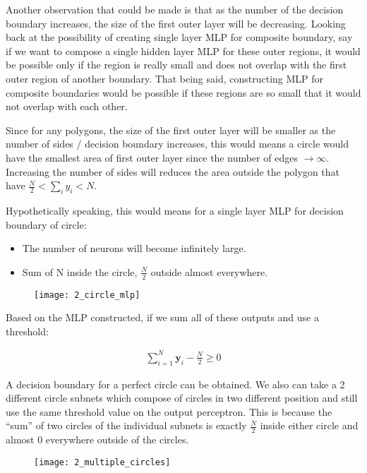 \hfill\break
Another observation that could be made is that as the number of the decision boundary increases, the size of the first outer layer will be decreasing. Looking back at the possibility of creating single layer MLP for composite boundary, say if we want to compose a single hidden layer MLP for these outer regions, it would be possible only if the region is really small and does not overlap with the first outer region of another boundary. That being said, constructing MLP for composite boundaries would be possible if these regions are so small that it would not overlap with each other.

\hfill\break
Since for any polygons, the size of the first outer layer will be smaller as the number of sides / decision boundary increases, this would means a circle would have the smallest area of first outer layer since the number of edges $\rightarrow\infty$. Increasing the number of sides will reduces the area outside the polygon that have $\frac{N}{2}<\sum_{i}{y_i}<N$.

\hfill\break
Hypothetically speaking, this would means for a single layer MLP for decision boundary of circle:
\begin{itemize}
	\item The number of neurons will become infinitely large.
	\item Sum of N inside the circle, $\frac{N}{2}$ outside almost everywhere.
\end{itemize}

\begin{figure}[H]
	\centering
	\texttt{[image: 2\_circle\_mlp]}
\end{figure}

Based on the MLP constructed, if we sum all of these outputs and use a threshold:

\begin{align}
	\sum^N_{i=1}\mathbf{y}_i - \frac{N}{2} \geq 0
\end{align}

\hfill\break
A decision boundary for a perfect circle can be obtained. We also can take a 2 different circle subnets which compose of circles in two different position and still use the same threshold value on the output perceptron. This is because the ``sum'' of two circles of the individual subnets is exactly $\frac{N}{2}$ inside either circle and almost $0$ everywhere outside of the circles.

\begin{figure}[H]
	\centering
	\texttt{[image: 2\_multiple\_circles]}
\end{figure}

